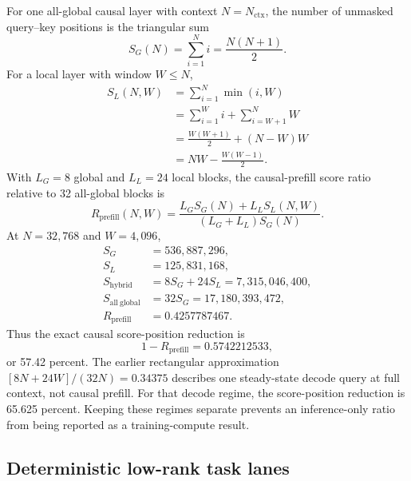\documentclass[10pt,letterpaper]{article}
\newcommand{\1}{\mathbb{1}}
\begin{document}
For one all-global causal layer with context $N=N_{\mathrm{ctx}}$, the number of unmasked query--key
positions is the triangular sum
\begin{equation}
  S_G(N)=\sum_{i=1}^{N}i=\frac{N(N+1)}{2}.
  \label{eq:global-score-count}
\end{equation}
For a local layer with window $W\le N$,
\begin{align}
  S_L(N,W)
  &=\sum_{i=1}^{N}\min(i,W)\\
  &=\sum_{i=1}^{W}i+\sum_{i=W+1}^{N}W\\
  &=\frac{W(W+1)}{2}+(N-W)W\\
  &=NW-\frac{W(W-1)}{2}.
  \label{eq:local-score-count}
\end{align}
With $L_G=8$ global and $L_L=24$ local blocks, the causal-prefill score ratio relative to 32
all-global blocks is
\begin{equation}
  R_{\mathrm{prefill}}(N,W)
  =\frac{L_GS_G(N)+L_LS_L(N,W)}{(L_G+L_L)S_G(N)}.
  \label{eq:prefill-ratio}
\end{equation}
At $N=32{,}768$ and $W=4{,}096$,
\begin{align}
  S_G &= 536{,}887{,}296,\\
  S_L &= 125{,}831{,}168,\\
  S_{\mathrm{hybrid}}
      &=8S_G+24S_L=7{,}315{,}046{,}400,\\
  S_{\mathrm{all\ global}}
      &=32S_G=17{,}180{,}393{,}472,\\
  R_{\mathrm{prefill}}&=0.4257787467.
\end{align}
Thus the exact causal score-position reduction is
\begin{equation}
  1-R_{\mathrm{prefill}}=0.5742212533,
\end{equation}
or 57.42 percent.  The earlier rectangular approximation
$[8N+24W]/(32N)=0.34375$ describes one steady-state decode query at full context, not causal prefill.
For that decode regime, the score-position reduction is 65.625 percent.  Keeping these regimes
separate prevents an inference-only ratio from being reported as a training-compute result.

\subsection{Deterministic low-rank task lanes}
\end{document}
